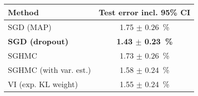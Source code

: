 \begin{tabular}{lc}
\toprule
                Method &    Test error incl. 95\% CI \\
\midrule
             SGD (MAP) &          1.75 $\pm$ 0.26~\% \\
\textbf{SGD (dropout)} & \textbf{1.43 $\pm$ 0.23~\%} \\
                 SGHMC &          1.73 $\pm$ 0.26~\% \\
SGHMC (with var. est.) &          1.58 $\pm$ 0.24~\% \\
   VI (exp. KL weight) &          1.55 $\pm$ 0.24~\% \\
\bottomrule
\end{tabular}
